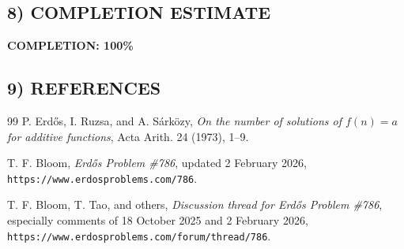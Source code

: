 \subsection*{8) COMPLETION ESTIMATE}
\textbf{COMPLETION: 100\%}

\subsection*{9) REFERENCES}
\begin{thebibliography}{99}
P. Erd\H{o}s, I. Ruzsa, and A. S\'ark\"ozy,
\emph{On the number of solutions of $f(n)=a$ for additive functions},
Acta Arith. 24 (1973), 1--9.

T. F. Bloom,
\emph{Erd\H{o}s Problem \#786}, updated 2 February 2026,
\texttt{https://www.erdosproblems.com/786}.

T. F. Bloom, T. Tao, and others,
\emph{Discussion thread for Erd\H{o}s Problem \#786}, especially comments of 18 October 2025 and 2 February 2026,
\texttt{https://www.erdosproblems.com/forum/thread/786}.
\end{thebibliography}

